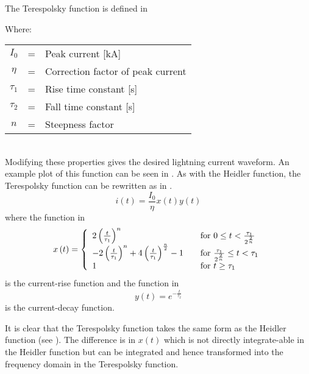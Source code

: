 The Terespolsky function is defined in 

Where: \\
\begin{tabular}{cll}
	$I_0$ & = & Peak current [kA] \\
	$\eta$ & = & Correction factor of peak current \\
	$\tau_1$ & = & Rise time constant [s] \\
	$\tau_2$ & = & Fall time constant [s] \\
	$n$ & = & Steepness factor
\end{tabular}\\

Modifying these properties gives the desired lightning current waveform. An example plot of this function can be seen in .
As with the Heidler function, the Terespolsky function can be rewritten as in .
\begin{equation}
i(t) = \frac{I_0}{\eta} x \left( t \right) y \left( t \right)
\label{eqn:TFSmall}
\end{equation}
where the function in 
\begin{equation}
	x \left( t \right) = \left\{
	  \begin{array}{l l}
	    2 \left( \frac{t}{\tau_1} \right )^n & \quad \textrm{for $0 \leq t < \frac{\tau_1}{2^{\frac{2}{n}}}$} \\
	    -2 \left( \frac{t}{\tau_1} \right )^n +4 \left( \frac{t}{\tau_1} \right )^{\frac{n}{2}} -1 & \quad \textrm{for $\frac{\tau_1}{2^{\frac{2}{n}}} \leq t < \tau_1$} \\
	    1 & \quad \textrm{for $t \geq \tau_1$}
	  \end{array} \right.
	\label{eqn:TFrise}
\end{equation}
is the current-rise function and the function in 
\begin{equation}
	y \left( t \right) = e^{-\frac{t}{\tau_2}}
	\label{eqn:TFfall}
\end{equation}
is the current-decay function.

It is clear that the Terespolsky function takes the same form as the Heidler function (see ). The difference is in $x \left( t \right)$ which is not directly integrate-able in the Heidler function but can be integrated and hence transformed into the frequency domain in the Terespolsky function.

